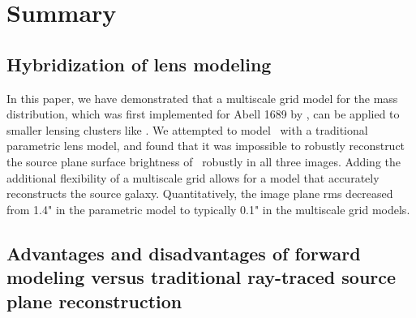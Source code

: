 \section{Summary}
\label{chap4:sec:summary}

\subsection{Hybridization of lens modeling}
In this paper, we have demonstrated that a multiscale grid model for the mass distribution, which was first implemented for Abell 1689 by \citet{Jullo:2009ij}, can be applied to smaller lensing clusters like \cluster. We attempted to model \cluster\ with a traditional parametric lens model, and found that it was impossible to robustly reconstruct the source plane surface brightness of \giantarc\ robustly in all three images. Adding the additional flexibility of a multiscale grid allows for a model that accurately reconstructs the source galaxy. Quantitatively, the image plane rms decreased from 1.4" in the parametric model to typically 0.1" in the multiscale grid models.

\subsection{Advantages and disadvantages of forward modeling versus traditional ray-traced source plane reconstruction}
\label{chap4:subsec:method_comparison}

